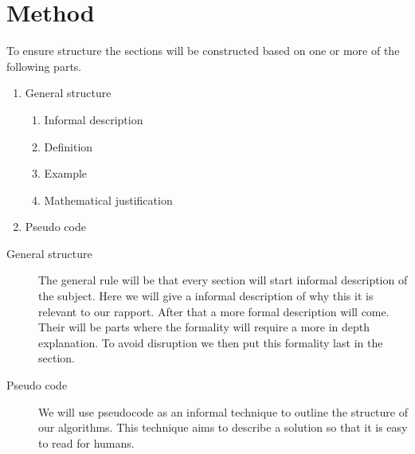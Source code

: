 \section{Method}
To ensure structure the sections will be constructed based on one or more of the following parts.
\begin{enumerate}
    \item General structure 
    \begin{enumerate}
        \item Informal description
        \item Definition
        \item Example
        \item Mathematical justification    
   
    \end{enumerate}
  
    \item Pseudo code
\end{enumerate}

\begin{description}
    \item[General structure] The general rule will be that every section will start informal description of the subject. Here we will give a informal description of why this it is relevant to our rapport. After that a more formal description will come. Their will be parts where the formality will require a more in depth explanation. To avoid disruption we then put this formality last in the section. 
    
    
    \item[Pseudo code]  We will use pseudocode as an informal technique to outline the structure of our algorithms. This technique aims to describe a solution so that it is easy to read for humans.

\end{description}

